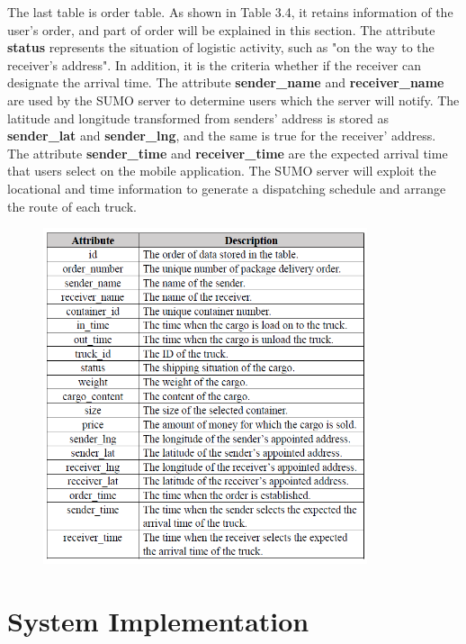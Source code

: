 \documentclass[12pt]{ksthesis}
\begin{document}
\begin{thesis}
{The last table is order table. As shown in Table 3.4, it retains information of the user’s order, and part of order will be explained in this section. The attribute \textbf{status} represents the situation of logistic activity, such as "on the way to the receiver’s address". 
In addition, it is the criteria whether if the receiver can designate the arrival time. The attribute \textbf{sender\_name} and \textbf{receiver\_name} are used by the SUMO server to determine users which the server will notify. The latitude and longitude transformed from senders’ address is stored as \textbf{sender\_lat} and \textbf{sender\_lng}, and the same is true for the receiver’ address. The attribute \textbf{sender\_time} and \textbf{receiver\_time} are the expected arrival time that users select on the mobile application. The SUMO server will exploit the locational and time information to generate a dispatching schedule and arrange the route of each truck. 

\begin{figure}[H]
\centering
{}
\includegraphics[width=0.85\textwidth]{./figures/Table3-4-OrderTable.PNG}
\vspace{0.5cm}
\label{Fig:OrderTable}
\end{figure}

  



\chapter{System Implementation}\label{Chap:System_Implementation}

}
\end{thesis}
\end{document}
